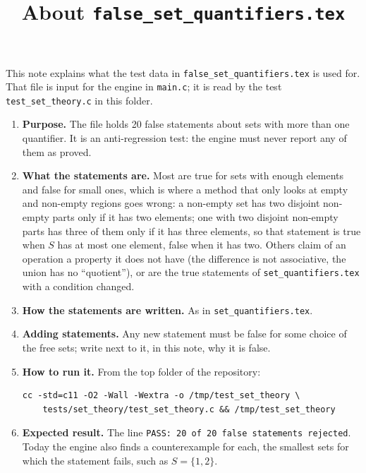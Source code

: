 \documentclass[11pt,a4paper]{article}
\title{About \texttt{false\_set\_quantifiers.tex}}
\author{}
\date{}
\begin{document}
\maketitle
This note explains what the test data in \texttt{false\_set\_quantifiers.tex} is used for. That file is input for the engine in \texttt{main.c}; it is read by the test \texttt{test\_set\_theory.c} in this folder.

\begin{enumerate}
\item \textbf{Purpose.} The file holds 20 false statements about sets with more than one quantifier. It is an anti-regression test: the engine must never report any of them as proved.

\item \textbf{What the statements are.} Most are true for sets with enough elements and false for small ones, which is where a method that only looks at empty and non-empty regions goes wrong: a non-empty set has two disjoint non-empty parts only if it has two elements; one with two disjoint non-empty parts has three of them only if it has three elements, so that statement is true when $S$ has at most one element, false when it has two. Others claim of an operation a property it does not have (the difference is not associative, the union has no ``quotient''), or are the true statements of \texttt{set\_quantifiers.tex} with a condition changed.

\item \textbf{How the statements are written.} As in \texttt{set\_quantifiers.tex}.

\item \textbf{Adding statements.} Any new statement must be false for some choice of the free sets; write next to it, in this note, why it is false.

\item \textbf{How to run it.} From the top folder of the repository:
\begin{verbatim}
cc -std=c11 -O2 -Wall -Wextra -o /tmp/test_set_theory \
    tests/set_theory/test_set_theory.c && /tmp/test_set_theory
\end{verbatim}

\item \textbf{Expected result.} The line \texttt{PASS: 20 of 20 false statements rejected}. Today the engine also finds a counterexample for each, the smallest sets for which the statement fails, such as $S = \{1, 2\}$.
\end{enumerate}
\end{document}
